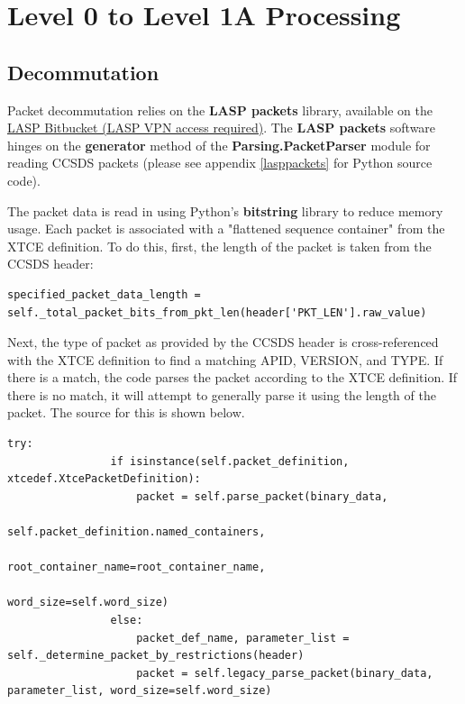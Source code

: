 \section{Level 0 to Level 1A Processing}
\subsection{Decommutation}
Packet decommutation relies on the \textbf{LASP packets} library, available on the \href{https://bitbucket.lasp.colorado.edu/projects/SDS/repos/lasp_packets/browse}{LASP Bitbucket (LASP VPN access required)}. The \textbf{LASP packets} software hinges on the \textbf{generator} method of the \textbf{Parsing.PacketParser} module for reading CCSDS packets (please see appendix \ref{lasppackets} for Python source code).

The packet data is read in using Python's \textbf{bitstring} library to reduce memory usage. Each packet is associated with a "flattened sequence container" from the XTCE definition. To do this, first, the length of the packet is taken from the CCSDS header:

\begin{verbatim}
specified_packet_data_length = self._total_packet_bits_from_pkt_len(header['PKT_LEN'].raw_value)
\end{verbatim}

Next, the type of packet as provided by the CCSDS header is cross-referenced with the XTCE definition to find a matching APID, VERSION, and TYPE. If there is a match, the code parses the packet according to the XTCE definition. If there is no match, it will attempt to generally parse it using the length of the packet. The source for this is shown below.

\begin{verbatim}
try:
                if isinstance(self.packet_definition, xtcedef.XtcePacketDefinition):
                    packet = self.parse_packet(binary_data,
                                               self.packet_definition.named_containers,
                                               root_container_name=root_container_name,
                                               word_size=self.word_size)
                else:
                    packet_def_name, parameter_list = self._determine_packet_by_restrictions(header)
                    packet = self.legacy_parse_packet(binary_data, parameter_list, word_size=self.word_size)

\end{verbatim}

